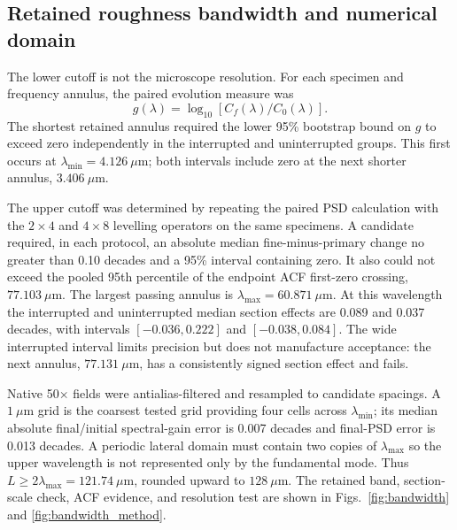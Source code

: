 \documentclass[final,12pt]{cas-sc}
\begin{document}
\subsection{Retained roughness bandwidth and numerical domain}

The lower cutoff is not the microscope resolution. For each specimen and
frequency annulus, the paired evolution measure was
\begin{equation}
g(\lambda)=\log_{10}\left[C_f(\lambda)/C_0(\lambda)\right].
\end{equation}
The shortest retained annulus required the lower 95\% bootstrap bound on $g$
to exceed zero independently in the interrupted and uninterrupted groups.
This first occurs at $\lambda_{\min}=4.126~\mu$m; both intervals include zero
at the next shorter annulus, $3.406~\mu$m.

The upper cutoff was determined by repeating the paired PSD calculation with
the $2\times4$ and $4\times8$ levelling operators on the same specimens.
A candidate required, in each protocol, an absolute median fine-minus-primary
change no greater than 0.10 decades and a 95\% interval containing zero. It
also could not exceed the pooled 95th percentile of the endpoint ACF first-zero
crossing, $77.103~\mu$m. The largest passing annulus is
$\lambda_{\max}=60.871~\mu$m. At this wavelength the interrupted and
uninterrupted median section effects are 0.089 and 0.037 decades, with
intervals $[-0.036,0.222]$ and $[-0.038,0.084]$. The wide interrupted
interval limits precision but does not manufacture acceptance: the next
annulus, $77.131~\mu$m, has a consistently signed section effect and fails.

Native 50$\times$ fields were antialias-filtered and resampled to candidate
spacings. A $1~\mu$m grid is the coarsest tested grid providing four cells
across $\lambda_{\min}$; its median absolute final/initial spectral-gain error
is 0.007 decades and final-PSD error is 0.013 decades. A periodic lateral
domain must contain two copies of $\lambda_{\max}$ so the upper wavelength is
not represented only by the fundamental mode. Thus
$L\geq2\lambda_{\max}=121.74~\mu$m, rounded upward to $128~\mu$m. The retained
band, section-scale check, ACF evidence, and resolution test are shown in
Figs.~\ref{fig:bandwidth} and \ref{fig:bandwidth_method}.
\end{document}
